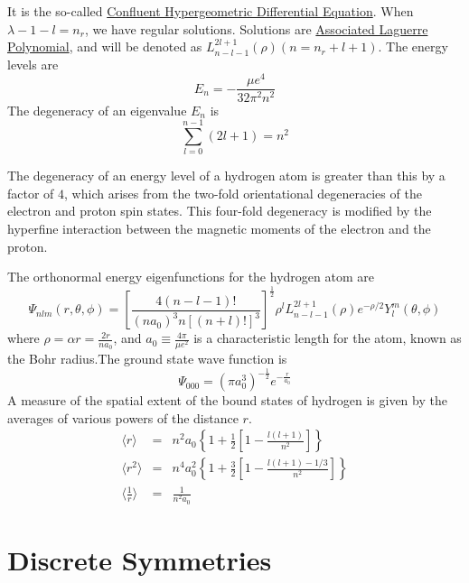 It is the so-called \href{http://mathworld.wolfram.com/ConfluentHypergeometricDifferentialEquation.html}{Confluent Hypergeometric Differential Equation}.
When $\lambda - 1- l = n_r$, we have regular solutions. Solutions are \href{https://en.wikipedia.org/wiki/Laguerre_polynomials#Generalized_Laguerre_polynomials}{Associated Laguerre Polynomial}, and will be denoted as $L_{n-l-1}^{2l+1}(\rho) (n=n_r+l+1)$. The energy levels are
\[E_n = -\frac{\mu e^4}{32\pi^2 n^2}\]
The degeneracy of an eigenvalue $E_n$ is
\[\sum_{l=0}^{n-1} (2l+1) = n^2\]
\begin{note}
The degeneracy of an energy level of a hydrogen atom is greater than this by a factor of $4$, which arises from the two-fold orientational degeneracies of the electron and proton spin states. This four-fold degeneracy is modified by the hyperfine interaction between the magnetic moments of the electron and the proton.
\end{note}
\noindent
The orthonormal energy eigenfunctions for the hydrogen atom are
\[\Psi_{nlm}(r,\theta,\phi) =  \left[ \frac{4(n-l-1)!}{(na_0)^3 n[(n+l)!]^3} \right]^{\frac{1}{2}} \rho^l L_{n-l-1}^{2l+1}(\rho) e^{-\rho/2} Y_l^m (\theta,\phi)\]
where $\rho = \alpha r = \frac{2r}{na_0}$, and $a_0 \equiv \frac{4\pi}{\mu e^2}$ is a characteristic length for the
atom, known as the Bohr radius.The ground state wave
function is
\[\Psi_{000} = (\pi a_0^3)^{-\frac{1}{2}} e^{-\frac{r}{a_0}}\]
A measure of the spatial extent of the bound states of hydrogen is given by the averages of various powers of the distance $r$.
\begin{eqnarray}
\langle r \rangle &=& n^2a_0 \left \{ 1 + \frac{1}{2} \left [ 1 - \frac{l(l+1)}{n^2} \right] \right\} \nonumber \\
\langle r^2 \rangle &=& n^4a_0^2 \left \{ 1 + \frac{3}{2} \left [ 1 - \frac{l(l+1)-1/3}{n^2} \right] \right\} \nonumber \\
\langle \frac{1}{r} \rangle &=& \frac{1}{n^2 a_0} \nonumber
\end{eqnarray}

\chapter{Discrete Symmetries}
